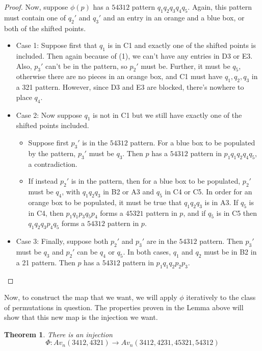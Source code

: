 \documentclass[11pt]{amsart}
\newtheorem{theorem}{Theorem}[section]								\newtheorem{proposition}[theorem]{Proposition}
\theoremstyle{remark}
\numberwithin{equation}{section}
\begin{document}
\begin{proof}
    Now, suppose $\phi(p)$ has a $54312$ pattern $q_1q_2q_3q_4q_5$. Again, this pattern must contain one of $q_2'$ and $q_3'$ and an entry in an orange and a blue box, or both of the shifted points. 

    \begin{itemize}
        \item Case 1: Suppose first that $q_1$ is in C1 and exactly one of the shifted points is included. Then again because of (1), we can't have any entries in D3 or E3. Also, $p_3'$ can't be in the pattern, so $p_2'$ must be. Further, it must be $q_5$, otherwise there are no pieces in an orange box, and C1 must have $q_1,q_2,q_3$ in a 321 pattern. However, since D3 and E3 are blocked, there's nowhere to place $q_4$. 
        \item Case 2: Now suppose $q_1$ is not in C1 but we still have exactly one of the shifted points included.
        \begin{itemize}
            \item Suppose first $p_3'$ is in the $54312$ pattern. For a blue box to be populated by the pattern, $p_3'$ must be $q_3$. Then $p$ has a $54312$ pattern in $p_1q_1q_2q_4q_5$, a contradiction. 
            \item If instead $p_2'$ is in the pattern, then for a blue box to be populated, $p_2'$ must be $q_4$, with $q_1q_2q_3$ in B2 or A3 and $q_5$ in C4 or C5. In order for an orange box to be populated, it must be true that $q_1q_2q_3$ is in A3. If $q_5$ is in C4, then $p_1q_1p_3q_5p_4$ forms a $45321$ pattern in $p$, and if $q_5$ is in C5 then $q_1q_2q_3p_4q_5$ forms a $54312$ pattern in $p$. 
        \end{itemize}
        \item Case 3: Finally, suppose both $p_2'$ and $p_3'$ are in the $54312$ pattern. Then $p_3'$ must be $q_3$ and $p_2'$ can be $q_4$ or $q_5$. In both cases, $q_1$ and $q_2$ must be in B2 in a 21 pattern. Then $p$ has a $54312$ pattern in $p_1q_1q_2p_2p_3$.
    \end{itemize}

     

\end{proof}

Now, to construct the map that we want, we will apply $\phi$ iteratively to the class of permutations in question. The properties proven in the Lemma above will show that this new map is the injection we want.

\begin{theorem}
    There is an injection 
    \[
    \Phi:Av_n(3412,4321) \rightarrow Av_n(3412,4231,45321,54312)
    \]
\end{theorem}
\end{document}
